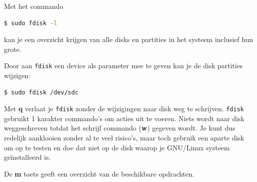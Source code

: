 Met het commando
\begin{lstlisting}[language=bash]
$ sudo fdisk -l
\end{lstlisting}
kan je een overzicht krijgen van alle disks en partities in het systeem inclusief hun grote.

Door aan \texttt{fdisk} een device als parameter mee te geven kan je de disk partities wijzigen:
\begin{lstlisting}[language=bash]
$ sudo fdisk /dev/sdc
\end{lstlisting}

Met \textbf{q} verlaat je \texttt{fdisk} zonder de wijzigingen naar disk weg te schrijven. \texttt{fdisk} gebruikt 1 karakter commando's om acties uit te voeren. Niets wordt naar disk weggeschreven totdat het schrijf commando (\textbf{w}) gegeven wordt. Je kunt dus redelijk aanklooien zonder al te  veel risico's, maar toch gebruik een aparte disk om op te testen en doe dat niet op de disk waarop je GNU/Linux systeem ge\"installeerd is.

De \textbf{m} toets geeft een overzicht van de beschikbare opdrachten.

